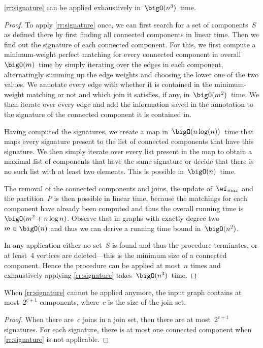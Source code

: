 \begin{lemma}\label{lem:signatureruntime}
  \autoref{rr:signature} can be applied exhaustively in~$\bigO(n^3)$~time.
\end{lemma}
\begin{proof}
  To apply \autoref{rr:signature} once, we can first search for a set of components~$S$ as defined there by first finding all connected components in linear time. Then we find out the signature of each connected component. For this, we first compute a minimum-weight perfect matching for every connected component in overall~$\bigO(m)$~time by simply iterating over the edges in each component, alternatingly summing up the edge weights and choosing the lower one of the two values. We annotate every edge with whether it is contained in the minimum-weight matching or not and which join it satisfies, if any, in~$\bigO(m^2)$~time. We then iterate over every edge and add the information saved in the annotation to the signature of the connected component it is contained in. 

Having computed the signatures, we create a map in~$\bigO(n\log(n))$~time that maps every signature present to the list of connected components that have this signature. We then simply iterate over every list present in the map to obtain a maximal list of components that have the same signature or decide that there is no such list with at least two elements. This is possible in~$\bigO(n)$~time. 

The removal of the connected components and joins, the update of~$\wf_{max}$ and the partition~$P$ is then possible in linear time, because the matchings for each component have already been computed and thus the overall running time is~$\bigO(m^2 + n \log n)$. Observe that in graphs with exactly degree two~$m \in \bigO(n)$ and thus we can derive a running time bound in~$\bigO(n^2)$.
  
In any application either no set~$S$ is found and thus the procedure terminates, or at least~4 vertices are deleted---this is the minimum size of a connected component. Hence the procedure can be applied at most~$n$ times and exhaustively applying \autoref{rr:signature} takes~$\bigO(n^3)$~time.
\end{proof}
\begin{observation}
  When \autoref{rr:signature} cannot be applied anymore, the input graph contains at most~$2^{c + 1}$ components, where~$c$ is the size of the join set.
\end{observation}
\begin{proof}
  When there are~$c$ joins in a join set, then there are at most~$2^{c + 1}$ signatures. For each signature, there is at most one connected component when \autoref{rr:signature} is not applicable.
\end{proof}

